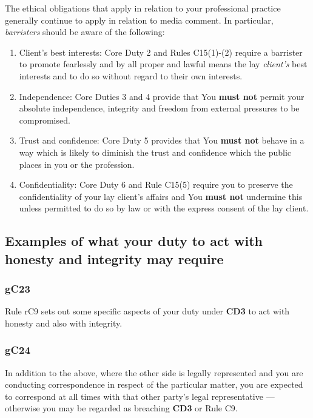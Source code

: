 The ethical obligations that apply in relation to your professional
practice generally continue to apply in relation to media comment. In
particular, \emph{barristers} should be aware of the following:
\begin{enumerate}[label=•]
\item Client's best interests: Core Duty 2 and Rules C15(1)-(2) require a
barrister to promote fearlessly and by all proper and lawful means the
lay \emph{client's} best interests and to do so without regard to their
own interests.

\item Independence: Core Duties 3 and 4 provide that You \textcolor{myred}{\textbf{must not}} permit
your absolute independence, integrity and freedom from external
pressures to be compromised.

\item Trust and confidence: Core Duty 5 provides that You \textcolor{myred}{\textbf{must not}} behave in
a way which is likely to diminish the trust and confidence which the
public places in you or the profession.

\item Confidentiality: Core Duty 6 and Rule C15(5) require you to preserve
the confidentiality of your lay client's affairs and You \textcolor{myred}{\textbf{must not}}
undermine this unless permitted to do so by law or with the express
consent of the lay client.

\end{enumerate}
\subsection{Examples of what your duty to act with honesty and integrity may
require}

\subsubsection{\color{darkgrey}gC23}

Rule rC9 sets out some specific aspects of your duty under  \textbf{\textcolor{mygold}{CD3}} to act
with honesty and also with integrity.

\subsubsection{\color{darkgrey}gC24}

In addition to the above, where the other side is legally represented
and you are conducting correspondence in respect of the particular
matter, you are expected to correspond at all times with that other
party's legal representative — otherwise you may be regarded as
breaching  \textbf{\textcolor{mygold}{CD3}} or Rule C9.

